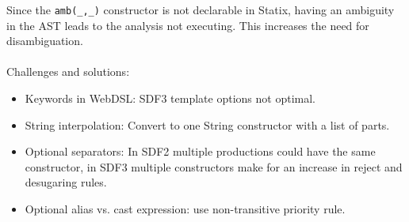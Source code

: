     Since the \texttt{amb(\_,\_)} constructor is not declarable in Statix, having an ambiguity in the AST leads to the analysis not executing. This increases the need for disambiguation.
    \\\\Challenges and solutions:
    \begin{itemize}
      \item Keywords in WebDSL: SDF3 template options not optimal.
      \item String interpolation: Convert to one String constructor with a list of parts.
      \item Optional separators: In SDF2 multiple productions could have the same constructor, in SDF3 multiple constructors make for an increase in reject and desugaring rules.
      \item Optional alias vs. cast expression: use non-transitive priority rule.
    \end{itemize}
